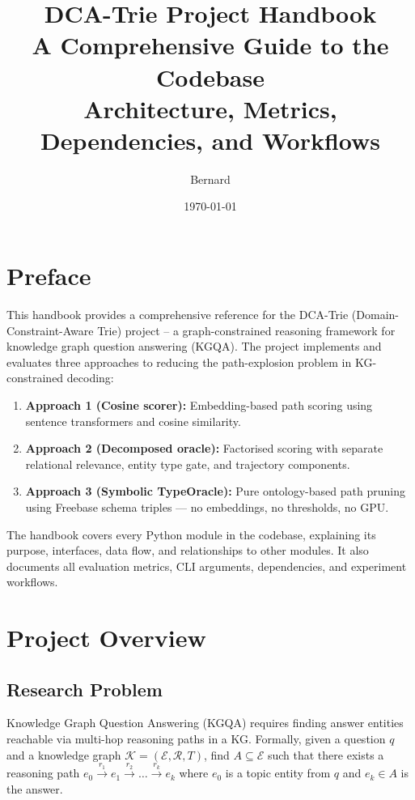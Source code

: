 \documentclass[11pt,a4paper,oneside,openany]{book}
\title{\Huge DCA-Trie Project Handbook\\[10pt]
       \Large A Comprehensive Guide to the Codebase\\[20pt]
       \large Architecture, Metrics, Dependencies, and Workflows}
\author{Bernard}
\date{\today}
\theoremstyle{definition}
\begin{document}
\frontmatter
\maketitle
\tableofcontents

\chapter{Preface}

This handbook provides a comprehensive reference for the DCA-Trie (Domain-Constraint-Aware Trie) project -- a graph-constrained reasoning framework for knowledge graph question answering (KGQA). The project implements and evaluates three approaches to reducing the path-explosion problem in KG-constrained decoding:

\begin{enumerate}
	\item \textbf{Approach 1 (Cosine scorer):} Embedding-based path scoring using sentence transformers and cosine similarity.
	\item \textbf{Approach 2 (Decomposed oracle):} Factorised scoring with separate relational relevance, entity type gate, and trajectory components.
	\item \textbf{Approach 3 (Symbolic TypeOracle):} Pure ontology-based path pruning using Freebase schema triples --- no embeddings, no thresholds, no GPU.
\end{enumerate}

The handbook covers every Python module in the codebase, explaining its purpose, interfaces, data flow, and relationships to other modules. It also documents all evaluation metrics, CLI arguments, dependencies, and experiment workflows.

\mainmatter

\chapter{Project Overview}\label{ch:overview}

\section{Research Problem}

Knowledge Graph Question Answering (KGQA) requires finding answer entities reachable via multi-hop reasoning paths in a KG. Formally, given a question $q$ and a knowledge graph $\mathcal{K} = (\mathcal{E}, \mathcal{R}, T)$, find $A \subseteq \mathcal{E}$ such that there exists a reasoning path $e_0 \xrightarrow{r_1} e_1 \xrightarrow{r_2} \dots \xrightarrow{r_k} e_k$ where $e_0$ is a topic entity from $q$ and $e_k \in A$ is the answer.
\end{document}
